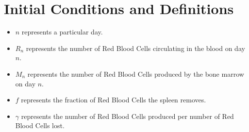 \section{Initial Conditions and Definitions}\label{sec:initial-conditions-and-definitions}

\begin{itemize}
    \item $n$ represents a particular day.
    \item $R_n$ represents the number of Red Blood Cells circulating in the blood on day $n$.
    \item $M_n$ represents the number of Red Blood Cells produced by the bone marrow on day $n$.
    \item $f$ represents the fraction of Red Blood Cells the spleen removes.
    \item $\gamma$ represents the number of Red Blood Cells produced per number of Red Blood Cells lost.
\end{itemize}
